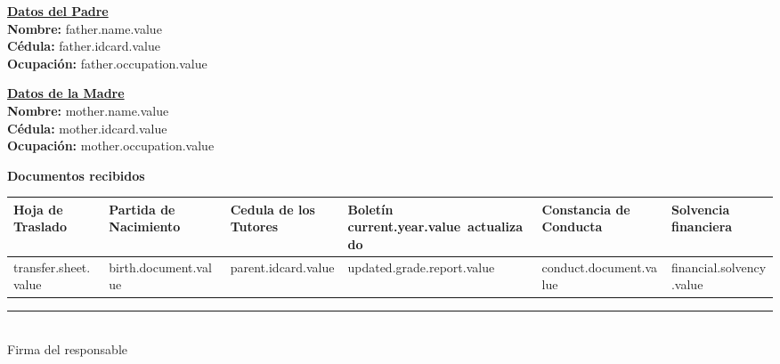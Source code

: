 \documentclass[12pt]{article}
\newcommand{\aField}[1]{#1}
\newcommand{\lineStretch}{\setstretch{1.5}}
\newcommand{\fatherName}{father.name.value}
\newcommand{\fatherIdcard}{father.idcard.value}
\newcommand{\fatherOccupation}{father.occupation.value}
\newcommand{\motherName}{mother.name.value}
\newcommand{\motherIdcard}{mother.idcard.value}
\newcommand{\motherOccupation}{mother.occupation.value}
\newcommand{\currentYear}{current.year.value}
\newcommand{\transferSheet}{transfer.sheet.value}
\newcommand{\birthDocument}{birth.document.value}
\newcommand{\parentIdcard}{parent.idcard.value}
\newcommand{\updatedGradeReport}{updated.grade.report.value}
\newcommand{\conductDocument}{conduct.document.value}
\newcommand{\financialSolvency}{financial.solvency.value}
\begin{document}
    \par\vspace{4mm}
    \begin{minipage}[t]{0.48\textwidth}
        \textbf{\uline{Datos del Padre}}\\
        \textbf{Nombre:} \aField{\fatherName}\\
        \textbf{Cédula:} \aField{\fatherIdcard}\\
        \textbf{Ocupación:} \aField{\fatherOccupation}
    \end{minipage}
    \hfill
    \begin{minipage}[t]{0.48\textwidth}
        \textbf{\uline{Datos de la Madre}}\\
        \textbf{Nombre:} \aField{\motherName}\\
        \textbf{Cédula:} \aField{\motherIdcard}\\
        \textbf{Ocupación:} \aField{\motherOccupation}
    \end{minipage}   

    \par\vspace{8mm}
    \lineStretch
    \textbf{Documentos recibidos}
    \begin{table}[H]
        \centering
        \begin{tabular}{|p{2cm}|p{2.3cm}|p{2.5cm}|p{2.8cm}|p{2.5cm}|p{2.1cm}|}
            \hline
            Hoja de Traslado &
            Partida de Nacimiento &
            Cedula de los Tutores &
            Boletín \currentYear\ actualizado &
            Constancia de Conducta &
            Solvencia financiera\\
            \hline
            \hspace{6mm}\transferSheet &
            \hspace{6mm}\birthDocument &
            \hspace{6mm}\parentIdcard &
            \hspace{6mm}\updatedGradeReport &
            \hspace{6mm}\conductDocument &
            \hspace{6mm}\financialSolvency\\
            \hline
        \end{tabular}
    \end{table}
    
    \begin{center}
        \rule{7cm}{0.4pt}\\
        Firma del responsable
    \end{center}
\end{document}
